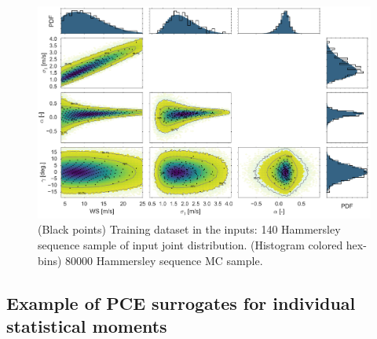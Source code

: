 \documentclass[preprint,12pt]{elsarticle}
\begin{document}
\begin{figure}[h!]
\begin{centering}
\includegraphics[width=0.9\linewidth]{Figures/PCE_train_x_full.jpg}
\caption{(Black points) Training dataset in the inputs: 140 Hammersley sequence sample of input joint distribution. (Histogram colored hex-bins) 80000 Hammersley sequence MC sample.}
\label{fig_PCE_train_x_full}
\end{centering}
\end{figure}

\subsection{Example of PCE surrogates for individual statistical moments}
\end{document}

